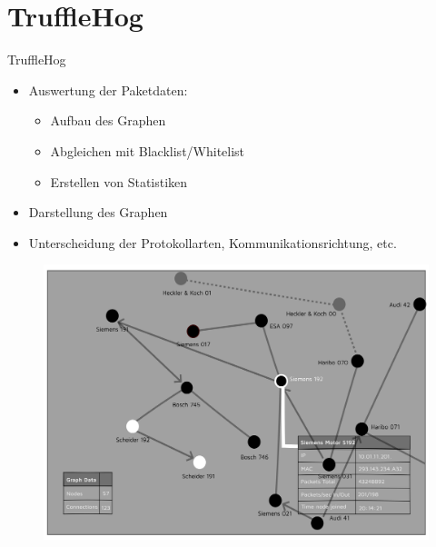 \documentclass[18pt]{beamer}
\begin{document}
\section{TruffleHog}
\begin{frame}{TruffleHog}
    \begin{itemize}
      \item Auswertung der Paketdaten: \pause
      \begin{itemize}
        \item Aufbau des Graphen \pause
        \item Abgleichen mit Blacklist/Whitelist \pause
        \item Erstellen von Statistiken \pause
      \end{itemize}
      
      \item Darstellung des Graphen  \pause
      \item Unterscheidung der Protokollarten, Kommunikationsrichtung, etc.
      
    \end{itemize}
\end{frame}

\begin{frame}
	\begin{figure}
		\includegraphics[height=0.95\textheight]{./images/GUI.png}
	\end{figure}
\end{frame}
\end{document}
